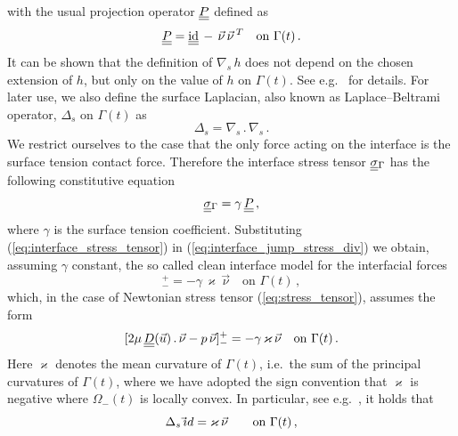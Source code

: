 \documentclass[a4paper,12pt,onecolumn]{article}
\newcommand{\nabs}{\nabla_{\!s}}
\newcommand{\id}{\rm id}
\newcommand{\mat}[1]{\underline{\underline{#1}}\rule{0pt}{0pt}}
\begin{document}
with the usual projection operator $\mat P$ defined as
\begin{equation}\label{eq:surface_projection}
\mat P=\mat\id\,-\,\vec\nu\,\vec\nu\,^T\quad \mbox{on } \Gamma(t)\,.
\end{equation}
It can be shown that the definition of $\nabs\,h$ does not depend on the chosen
extension of $h$, but only on the value of $h$ on $\Gamma(t)$. See e.g.\
\cite[\S2.1]{DeckelnickDE05} for details.
For later use, we also define the surface
Laplacian, also known as Laplace--Beltrami operator, $\Delta_s$ on $\Gamma(t)$
as
\begin{equation}\label{eq:surface_laplacian}
\Delta_s = \nabs\,.\,\nabs\,.
\end{equation}
We restrict ourselves to the case that the only force acting on the interface
is the surface tension contact force. Therefore the interface stress tensor
$\mat\sigma_\Gamma$ has the following constitutive equation
\begin{equation}\label{eq:interface_stress_tensor}
\mat\sigma_{\Gamma}=\gamma\,\mat P\,,
\end{equation}
where $\gamma$ is the surface tension coefficient. Substituting
(\ref{eq:interface_stress_tensor}) in (\ref{eq:interface_jump_stress_div}) we
obtain, assuming $\gamma$ constant, the so called clean interface model for
the interfacial forces
\begin{equation}
[\mat\sigma\,\vec \nu]_-^+ = -\gamma\,\varkappa\,\vec\nu \quad \mbox{on }
\Gamma(t)\,,
\end{equation}
which, in the case of Newtonian stress tensor (\ref{eq:stress_tensor}), assumes
the form
\begin{equation}\label{eq:interface_jump_stress}
[2\mu \,\mat D(\vec u)\,.\,\vec\nu - p\,\vec \nu]_-^+
= -\gamma\,\varkappa\,\vec\nu \quad \mbox{on } \Gamma(t)\,.
\end{equation}
Here $\varkappa$ denotes the mean curvature of $\Gamma(t)$, i.e.\ the sum of
the principal curvatures of $\Gamma(t)$, where we have adopted the sign
convention that $\varkappa$ is negative where $\Omega_-(t)$ is locally convex.
In particular, see e.g.\ \cite{DeckelnickDE05}, it holds that
\begin{equation} \label{eq:LBop}
\Delta_s\, \vec \id = \varkappa\, \vec\nu \qquad \mbox{on $\Gamma(t)$}\,,
\end{equation}
\end{document}
